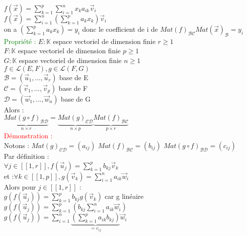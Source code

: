 \documentclass{article}
\begin{document}
        $f(\vec x)= \sum_{k=1}^p \sum_{i=1}^n x_k a_{ik} \vec v_i$ \\
        $f(\vec x)= \sum_{i=1}^n (\sum_{k=1}^p a_k x_k) \vec v_i$ \\
        on a $(\sum_{k=1}^p a_k x_k)=y_i$ donc le coefficient de i de $Mat(f)_{\mathcal{BC}} Mat(\vec x)_{\mathcal B}=y_i$ \\
        \textcolor{green}{Propriété :} $E: \mathbb K$ espace vectoriel de dimension finie $r \geq 1$ \\
        $F: \mathbb K$ espace vectoriel de dimension finie $p \geq 1$ \\
        $G: \mathbb K$ espace vectoriel de dimension finie $n \geq 1$ \\
        $f \in \mathcal L(E,F), g \in \mathcal L(F,G)$ \\
        $\mathcal B =( \vec u_1,..., \vec u_r) $ base de E \\
        $\mathcal C =( \vec v_1,..., \vec v_p) $ base de F \\
        $\mathcal D =( \vec w_1,..., \vec w_n) $ base de G \\
        Alors : \\
        $\underbrace{Mat(g \circ f)_{\mathcal{BD}}}_{n \times r}=\underbrace{Mat(g)_{\mathcal{CD}}}_{n \times p} \underbrace{Mat(f)_{\mathcal{BC}}}_{p \times r}$ \\
        \textcolor{red}{Démonstration :} \\
        Notons : $Mat(g)_{\mathcal{CD}}=(a_{ij})$
        $Mat(f)_{\mathcal{BC}}=(b_{ij})$
        $Mat(g \circ f)_{\mathcal{BD}}=(c_{ij})$  \\
        Par définition : \\
        $\forall j \in [[1,r]], f(\vec u_j)=\sum_{k=1}^p b_{kj} \vec v_k$\\
        et :$\forall k \in [[1,p]], g(\vec v_k)=\sum_{i=1}^n a_{ik} \vec w_i$ \\
        Alors pour $j \in [[ 1,r ]] $ : \\
        $g(f(\vec u_j))= \sum_{k=1}^p b_{kj} g(\vec v_k)$ car g linéaire \\
        $g(f(\vec u_j))=\sum_{k=1}^p(b_{kj}\sum_{i=1}^n a_{ik} \vec w_i)$ \\
        $g(f(\vec u_j))=\sum_{i=1}^n\underbrace{(\sum_{k=1}^p a_{ik} b_{kj})}_{=c_{ij}} \vec w_i$ \\
\end{document}
